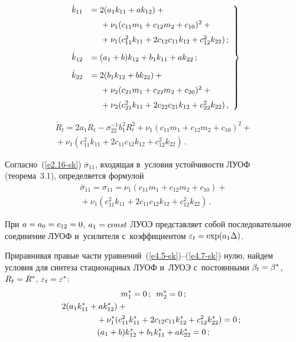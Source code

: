 \begin{multicols}{2}
\vspace*{-9pt}

\begin{equation}
\left.
\begin{array}{rl}
\dot k_{11} &= 2(a_1 k_{11} + a k_{12}) +{}\\[6pt]
&\hspace*{4mm}{}+\nu_1 (c_{11}m_1 + c_{12} m_2+ c_{10})^2+{}\\[6pt]
 &\hspace*{4mm}{}+\nu_1(c_{11}^2k_{11} +  2c_{12} c_{11} k_{12}+ c_{12}^2 k_{22})\,;\\[9pt]
\dot k_{12} &= (a_1 +b) k_{12} + b_{1} k_{11} +a k_{22}\,; \\[9pt]
\dot k_{22} &= 2(b_1k_{12}+b k_{22}) +{}\\[6pt]
&\hspace*{4mm}{}+\nu_2( c_{21} m_1 + c_{22} m_2 +
c_{20})^2 +{}\\[6pt]
 &\hspace*{4mm}{}+ \nu_2 (c_{21}^2 k_{11} +2 c_{22} c_{21} k_{12} + c_{22}^2 k_{22})\,,
 \end{array}
 \right\}
 \label{e4.6-sk}
 \end{equation}

\vspace*{-12pt}

\noindent
\begin{multline}
\dot R_t = 2 a_{1} R_t -\sigma_{22}^{-1}b_{1}^2 R_t^2 +
\nu_1 (c_{11} m_1+ c_{12} m_2+c_{10} )^2+{}\\
{}+\nu_1(c_{11}^2k_{11} +  2c_{11} c_{12} k_{12}+ c_{12}^2 k_{22})\,.\label{e4.7-sk}
\end{multline}

Согласно~(\ref{e2.16-sk}) $\bar \sigma_{11}$, входящая в~условия
устойчивости ЛУОФ (теорема~3.1), определяется формулой
\begin{multline*}
\bar \sigma_{11} =\sigma_{11} =\nu_1 (c_{11} m_1 + c_{12} m_2 + c_{10} )+{}\\
{}+ \nu_1 (c_{11}^2 k_{11} + 2 c_{11} c_{12} k_{12} + c_{12}^2 k_{22})\,. %
\end{multline*}

При $a=a_0\hm=c_{12}\hm=0$, $ a_1\hm=const$ ЛУОЭ пред\-став\-ля\-ет собой
последовательное соединение ЛУОФ и~усилителя с~коэффициентом
$\varepsilon_t \hm=\exp (a_1\Delta)$.

Приравнивая правые части уравнений~(\ref{e4.5-sk})--(\ref{e4.7-sk})
нулю, найдем условия для синтеза стационарных ЛУОФ и~ЛУОЭ с~постоянными
$\beta_t \hm=\beta^*$, $R_t\hm=R^*$, $\varepsilon_t\hm=\varepsilon^*$:
\begin{gather*}
m_1^* =0\,;\enskip m_2^* = 0\,; %
\\
2(a_1 k_{11}^* + a k_{12}^*) + {}\hspace*{50mm}\\
\hspace*{13mm}{}+\nu_1^*(c_{11}^2 k_{11}^* + 2 c_{12} c_{11} k_{12}^* + c_{12}^2 k_{22}^*)=
0\,;\\
(a_1 + b) k_{12}^* + b_1 k_{11}^* + a k_{22}^* =0\,;
\end{gather*}


\end{multicols}

